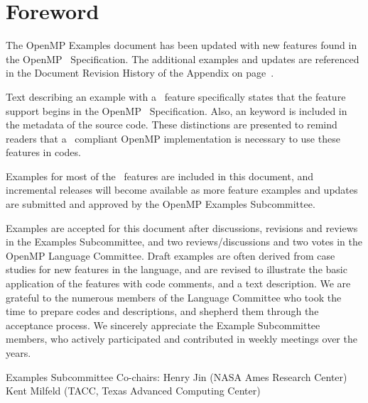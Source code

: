 \chapter*{Foreword}
\label{chap:foreword}

The OpenMP Examples document has been updated with new features
found in the OpenMP \VER\ Specification. The additional examples and updates
are referenced in the Document Revision History of the Appendix on page~\pageref{chap:history}.

Text describing an example with a \VER\ feature specifically states
that the feature support begins in the OpenMP \VER\ Specification.  Also,
an  keyword is included in the  metadata of the source code.
These distinctions are presented to remind readers that a \VER\ compliant 
OpenMP implementation is necessary to use these features in codes.

Examples for most of the \VER\ features are included in this document,
and incremental releases will become available as more feature examples
and updates are submitted and approved by the OpenMP Examples Subcommittee.

Examples are accepted for this document after discussions, revisions and reviews
in the Examples Subcommittee, and two reviews/discussions and two votes
in the OpenMP Language Committee.
Draft examples are often derived from case studies for new features in the language,
and are revised to illustrate the basic application of the features with code comments,
and a text description. We are grateful to the numerous members of the Language Committee 
who took the time to prepare codes and descriptions, and shepherd them through
the acceptance process. We sincerely appreciate the Example Subcommittee members, who 
actively participated and contributed in weekly meetings over the years.

\bigskip
Examples Subcommittee Co-chairs: \smallskip\linebreak
Henry Jin (\textsc{NASA} Ames Research Center) \linebreak
Kent Milfeld (\textsc{TACC}, Texas Advanced Computing Center)


